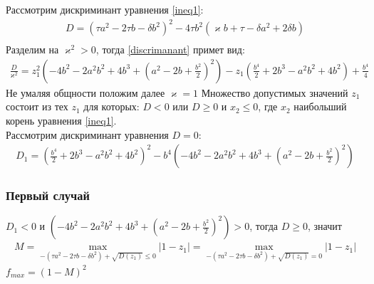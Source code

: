 \documentclass[a4paper]{article}
\begin{document}
Рассмотрим дискриминант уравнения \ref{ineq1}:
\begin{equation}\label{discrimanant}
 \begin{aligned}
D = (\tau a^2-2 \tau b - \delta b^2)^2 - 4\tau b^2 (\varkappa b+\tau-\delta a^2 + 2\delta b)\\
 \end{aligned}
\end{equation} 
Разделим на $\varkappa^2 > 0$, тогда \ref{discrimanant} примет вид:
\begin{equation}\label{discrimanant_transformed}
 \begin{aligned}
\frac{D}{\varkappa^2} = z_1^2(-4b^2-2a^2b^2+4b^3+(a^2-2b+\frac{b^2}{2})^2)-z_1(\frac{b^4}{2}+2b^3-a^2b^2+4b^2) + \frac{b^4}{4}
 \end{aligned}
\end{equation}
Не умаляя общности положим далее $\varkappa = 1$
Множество допустимых значений $z_1$ состоит из тех $z_1$ для которых:   $D < 0$ или $D \geq 0$ и $x_2 \leq 0$, где $x_2$ наибольший корень уравнения \ref{ineq1}.\\
Рассмотрим дискриминант уравнения $D = 0$:
\begin{equation}\label{discrimanant1}
 \begin{aligned}
D_1 = (\frac{b^4}{2}+2b^3-a^2b^2+4b^2)^2-b^4(-4b^2-2a^2b^2+4b^3+(a^2-2b+\frac{b^2}{2})^2)
 \end{aligned}
\end{equation}

\subsubsection{Первый случай}
$D_1 <  0$ и $(-4b^2-2a^2b^2+4b^3+(a^2-2b+\frac{b^2}{2})^2) > 0$, тогда $D \geq 0$, значит 
\begin{equation}
 \begin{aligned}
M = \max\limits_{-(\tau a^2-2 \tau b - \delta b^2)+\sqrt{D(z_1)}  \leq 0  }{|1-z_1|} = \max\limits_{-(\tau a^2-2 \tau b - \delta b^2)+\sqrt{D(z_1)}  = 0  }{|1-z_1|}
 \end{aligned}
\end{equation}
 $f_{max} = (1-M)^2$
 
\end{document}

